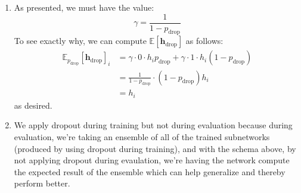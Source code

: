 \documentclass[12pt]{article}
\begin{document}
\begin{enumerate}[label=(\alph*)]
      \begin{enumerate}[label=\roman*]
        \item As presented, we must have the value:
          $$
            \gamma = \frac{1}{1 - p_{\text{drop}}}
          $$
          To see exactly why, we can compute $\mathbb{E}[\bm{h}_{\text{drop}}]$ as follows:
          \begin{align*}
            \mathbb{E}_{p_{\text{drop}}}[\bm{h}_{\text{drop}}]_i &= \gamma\cdot 0 \cdot h_i p_{\text{drop}} + \gamma \cdot 1 \cdot h_i (1 - p_{\text{drop}}) \\
            &= \frac{1}{1 - p_{\text{drop}}} \cdot (1 - p_{\text{drop}}) h_i \\
            &= h_i
          \end{align*}
          as desired.
        \item We apply dropout during training but not during evaluation because during evaluation, we're taking an ensemble of all of the trained subnetworks (produced by using dropout during training), and with the schema above, by not applying dropout during evaulation, we're having the network compute the expected result of the ensemble which can help generalize and thereby perform better.
      \end{enumerate}
\end{enumerate}
\end{document}
